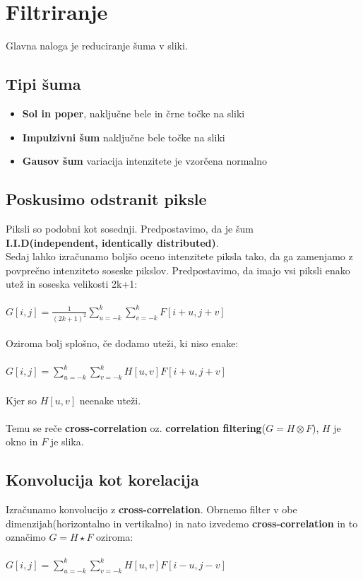 \documentclass[11pt]{article}
\begin{document}
\newpage

\section{Filtriranje}
Glavna naloga je reduciranje \v{s}uma v sliki.

\subsection{Tipi \v{s}uma}
\begin{itemize}
\item \textbf{Sol in poper}, naklju\v{c}ne bele in \v{c}rne to\v{c}ke na sliki
\item \textbf{Impulzivni \v{s}um} naklju\v{c}ne bele to\v{c}ke na sliki
\item \textbf{Gausov \v{s}um} variacija intenzitete je vzor\v{c}ena normalno
\end{itemize}

\subsection{Poskusimo odstranit piksle}
Piksli so podobni kot sosednji. Predpostavimo, da je \v{s}um \\ 
\textbf{I.I.D(independent, identically distributed)}. \\
Sedaj lahko izra\v{c}unamo bolj\v{s}o oceno intenzitete piksla tako, da ga zamenjamo z povpre\v{c}no intenziteto soseske pikslov. Predpostavimo, da imajo vsi piksli enako ute\v{z} in soseska velikosti 2k+1: \\
\\
$G[i, j] = \frac{1}{(2k+1)^2}\sum\limits_{u=-k}^k\sum\limits_{v=-k}^kF[i+u, j+v]$ \\
\\
Oziroma bolj splo\v{s}no, \v{c}e dodamo ute\v{z}i, ki niso enake: \\
\\
$G[i, j] = \sum\limits_{u=-k}^k\sum\limits_{v=-k}^kH[u, v]F[i+u, j+v]$ \\
\\
Kjer so $H[u, v]$ neenake ute\v{z}i. \\
\\
Temu se re\v{c}e \textbf{cross-correlation} oz. \textbf{correlation filtering}($G = H \otimes F$), $H$ je okno in $F$ je slika.

\subsection{Konvolucija kot korelacija}
Izra\v{c}unamo konvolucijo z \textbf{cross-correlation}. Obrnemo filter v obe dimenzijah(horizontalno in vertikalno) in nato izvedemo \textbf{cross-correlation} in to ozna\v{c}imo $G = H \star F$ oziroma: \\
\\
$G[i, j] = \sum\limits_{u=-k}^k\sum\limits_{v=-k}^kH[u, v]F[i-u, j-v]$
\end{document}
